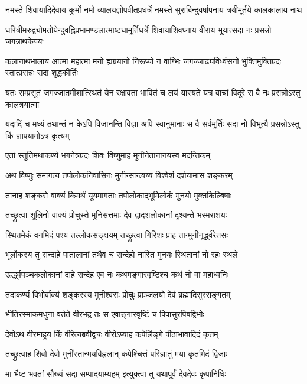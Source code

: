 \twolineshloka
{नमस्ते शिवायादिदेवाय कुर्मो नमो व्यालयज्ञोपवीतप्रधर्त्रे}
{नमस्ते सुराबिन्दुवर्षापनाय त्रयीमूर्तये कालकालाय नाथ}%

\twolineshloka
{धरित्रीमरुद्व्योमतोयेन्दुवह्निप्रभामण्डलात्माष्टधामूर्तिधर्त्रे}
{शिवायाशिवघ्नाय वीराय भूयात्सदा नः प्रसन्नो जगन्नाथकेज्यः}%

\twolineshloka
{कलानाथभालाय आत्मा महात्मा मनो ह्यग्रयानो निरूप्यो न वाग्भिः}
{जगज्जाढ्यविध्वंसनो भुक्तिमुक्तिप्रदः स्तात्प्रसन्नः सदा शुद्धकीर्तिः}%

\twolineshloka
{यतः सम्प्रसूतं जगज्जातमीशात्स्थितं येन रक्षावता भावितं च}
{लयं यास्यते यत्र वाचां विदूरे स वै नः प्रसन्नोऽस्तु कालत्रयात्मा}%

\twolineshloka
{यदादिं च मध्यं तथान्तं न केऽपि विजानन्ति विज्ञा अपि स्वानुमानाः}
{स वै सर्वमूर्तिः सदा नो विभूत्यै प्रसन्नोऽस्तु किं ज्ञापयामोऽत्र कृत्यम्}%

\twolineshloka
{एतां स्तुतिमथाकर्ण्य भगनेत्रप्रदः शिवः}
{विष्णुमाह मुनीनेतानानयस्व मदन्तिकम्}%

\twolineshloka
{अथ विष्णुः समागत्य तपोलोकनिवासिनः}
{मुनीन्सान्त्वय्य विश्वेशं दर्शयामास शङ्करम्}%

\twolineshloka
{तानाह शङ्करो वाक्यं किमर्थं यूयमागताः}
{तपोलोकाद्भूमिलोकं मुनयो मुक्तकिल्बिषाः}%

\twolineshloka
{तच्छ्रुत्वा शूलिनो वाक्यं प्रोचुस्ते मुनिसत्तमाः}
{देव द्वादशलोकानां दृश्यन्ते भस्मराशयः}%

\twolineshloka
{स्थितमेकं वनमिदं पश्य तल्लोकसङ्क्षयम्}
{तच्छ्रुत्वा गिरिशः प्राह तान्मुनीनूर्द्ध्वरेतसः}%

\twolineshloka
{भूर्लोकस्य तु सन्दाहे पातालानां तथैव च}
{सन्देहो नास्ति मुनयः स्थितानां नो रहः स्थले}%

\twolineshloka
{ऊर्द्ध्वपञ्चकलोकानां दाहे सन्देह एव नः}
{कथमङ्गारवृष्टिश्च कथं नो वा महाध्वनिः}%

\twolineshloka
{तदाकर्ण्य विभोर्वाक्यं शङ्करस्य मुनीश्वराः}
{प्रोचुः प्राञ्जलयो देवं ब्रह्मादिसुरसङ्गतम्}%

\twolineshloka
{भीतिरस्माकमधुना वर्तते वीरभद्र तः}
{स एवाङ्गारवृष्टिं च पिपासुरपिबद्विभोः}%

\twolineshloka
{देवोऽथ वीरमाहूय किं वीरेत्यब्रवीद्वचः}
{वीरोऽप्याह कपेर्लिङ्गे पीठाभावादिदं कृतम्}%

\twolineshloka
{तच्छ्रुत्वाह शिवो देवो मुनींस्तान्भयविह्वलान्}
{कपेश्चित्तं परिज्ञातुं मया कृतमिदं द्विजाः}%

\twolineshloka
{मा भैष्ट भवतां सौख्यं सदा सम्पादयाम्यहम्}
{इत्युक्त्वा तु यथापूर्वं देवदेवः कृपानिधिः}%

